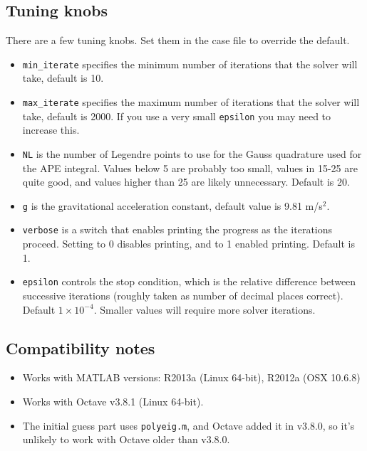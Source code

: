 \documentclass[letterpaper]{article}
\begin{document}
\subsection{Tuning knobs}
There are a few tuning knobs. Set them in the case file to override the default.
\begin{itemize}
 \item \verb+min_iterate+ specifies the minimum number of iterations that the solver will take, default is 10.
 \item \verb+max_iterate+ specifies the maximum number of iterations that the solver will take, default is 2000. If you use a very small \verb+epsilon+ you may need to increase this. 
 \item \verb+NL+ is the number of Legendre points to use for the Gauss quadrature used for the APE integral. Values below 5 are probably too small, values in 15-25 are quite good, and values higher than 25 are likely unnecessary. Default is 20.
 \item \verb+g+ is the gravitational acceleration constant, default value is 9.81 m/s$^2$.
 \item \verb+verbose+ is a switch that enables printing the progress as the iterations proceed. Setting to 0 disables printing, and to 1 enabled printing. Default is 1.
\item \verb+epsilon+ controls the stop condition, which is the relative difference between successive iterations (roughly taken as number of decimal places correct). Default $1\times10^{-4}$. Smaller values will require more solver iterations.
\end{itemize}

\subsection{Compatibility notes}
\begin{itemize}
 \item Works with MATLAB versions: R2013a (Linux 64-bit), R2012a (OSX 10.6.8)
 \item Works with Octave v3.8.1 (Linux 64-bit).
 \item The initial guess part uses \verb+polyeig.m+, and Octave added it in v3.8.0, so it's unlikely to work with Octave older than v3.8.0.
\end{itemize}
\end{document}
